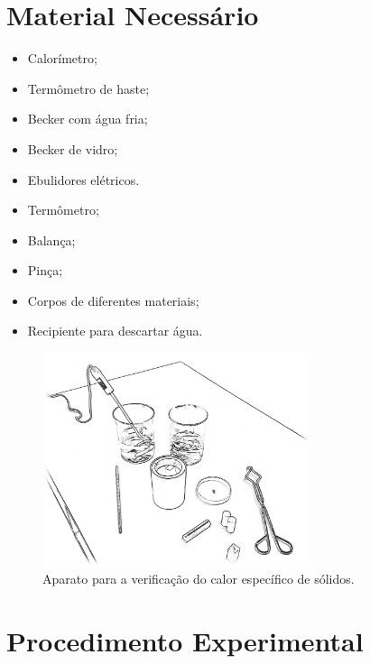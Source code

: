 \section{Material Necessário}

\begin{itemize}
	\item Calorímetro;
	\item Termômetro de haste;
	\item Becker com água fria;
	\item Becker de vidro;
	\item Ebulidores elétricos.
	\item Termômetro;
	\item Balança;
	\item Pinça;
	\item Corpos de diferentes materiais;
	\item Recipiente para descartar água.
\end{itemize}

\begin{figure}[!hbt]
	\centering
	\includegraphics[width=0.7\textwidth]{Ilustrations/AparatoCalorEspecifico}
	\caption{Aparato para a verificação do calor específico de sólidos.}
\end{figure}

\section{Procedimento Experimental}

